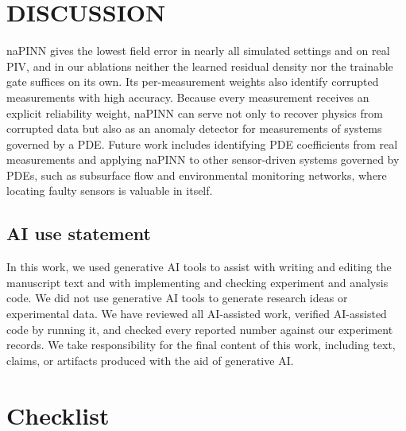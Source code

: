 \documentclass[twoside]{article}
\begin{document}
\section{DISCUSSION}
\label{sec:discussion}

naPINN gives the lowest field error in nearly all simulated settings and on
real PIV, and in our ablations neither the learned residual density nor the
trainable gate suffices on its own. Its per-measurement weights also identify
corrupted measurements with high accuracy. Because every measurement receives
an explicit reliability weight, naPINN can serve not only to recover physics
from corrupted data but also as an anomaly detector for measurements of systems
governed by a PDE. Future work includes identifying PDE coefficients from real
measurements and applying naPINN to other sensor-driven systems governed by
PDEs, such as subsurface flow and environmental monitoring networks, where
locating faulty sensors is valuable in itself.

\subsection*{AI use statement}
In this work, we used generative AI tools to assist with writing and editing
the manuscript text and with implementing and checking experiment and analysis
code. We did not use generative AI tools to generate research ideas or
experimental data. We have reviewed all AI-assisted work, verified
AI-assisted code by running it, and checked every reported number against our
experiment records. We take responsibility for the final content of this work,
including text, claims, or artifacts produced with the aid of generative AI.




\clearpage
\section*{Checklist}
\end{document}
